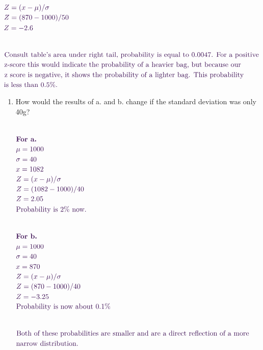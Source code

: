 \documentclass[12pt,a4paper]{article}
\providecommand{\tightlist}{%
  \setlength{\itemsep}{0pt}\setlength{\parskip}{0pt}}
\begin{document}
\begin{enumerate}
  \strut ~\\
  \(\color{waraubergine}Z = (x - \mu) / \sigma\)\\
  \(\color{waraubergine}Z = (870 - 1000) / 50\)\\
  \(\color{waraubergine}Z =  -2.6\)\\
  \strut ~\\
  \(\color{waraubergine}\text{Consult table's area under right tail, probability is equal to 0.0047. For a positive}\)\\
  \(\color{waraubergine}\text{z-score this would indicate the probability of a heavier bag, but because our}\)\\
  \(\color{waraubergine}\text{z score is negative, it shows the probability of a lighter bag. This probability}\)\\
  \(\color{waraubergine}\text{is less than 0.5\%.}\)
\end{enumerate}

\newpage

\begin{enumerate}
\def\labelenumi{\alph{enumi}.}
\setcounter{enumi}{2}
\tightlist
\item
  How would the results of a. and b. change if the standard deviation
  was only 40g?\\
  \strut ~\\
  \(\color{waraubergine}\text{\textbf{For a.}}\)\\
  \(\color{waraubergine}\mu = 1000\)\\
  \(\color{waraubergine}\sigma = 40\)\\
  \(\color{waraubergine}x = 1082\)\\
  \(\color{waraubergine}Z = (x - \mu) / \sigma\)\\
  \(\color{waraubergine}Z = (1082 - 1000) / 40\)\\
  \(\color{waraubergine}Z =  2.05\)\\
  \(\color{waraubergine}\text{Probability is 2\% now.}\)\\
  \strut ~\\
  \(\color{waraubergine}\text{\textbf{For b.}}\)\\
  \(\color{waraubergine}\mu = 1000\)\\
  \(\color{waraubergine}\sigma = 40\)\\
  \(\color{waraubergine}x = 870\)\\
  \(\color{waraubergine}Z = (x - \mu) / \sigma\)\\
  \(\color{waraubergine}Z = (870 - 1000) / 40\)\\
  \(\color{waraubergine}Z =  -3.25\)\\
  \(\color{waraubergine}\text{Probability is now about 0.1\%}\)\\
  \strut ~\\
  \(\color{waraubergine}\text{Both of these probabilities are smaller and are a direct reflection of a more}\)\\
  \(\color{waraubergine}\text{narrow distribution.}\)\\
\end{enumerate}
\end{document}

